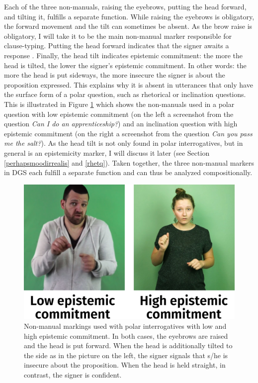 Each of the three non-manuals, raising the eyebrows, putting the head forward, and tilting it, fulfills a separate function. While raising the eyebrows is obligatory, the forward movement and the tilt can sometimes be absent. As the brow raise is obligatory, I will take it to be the main non-manual marker responsible for clause-typing. Putting the head forward indicates that the signer awaits a response \citep[171--172]{papaspyrou2008grammatik}. Finally, the head tilt indicates epistemic commitment: the more the head is tilted, the lower the signer's epistemic commitment. In other words: the more the head is put sideways, the more insecure the signer is about the proposition expressed. This explains why it is absent in utterances that only have the surface form of a polar question, such as rhetorical or inclination questions. This is illustrated in Figure \ref{fig:epistemiccommitment} which shows the non-manuals used in a polar question with low epistemic commitment (on the left a screenshot from the question \textit{Can I do an apprenticeship?}) and an inclination question with high epistemic commitment (on the right a screenshot from the question \textit{Can you pass me the salt?}). As the head tilt is not only found in polar interrogatives, but in general is an epistemicity marker, I will discuss it later (see Section \ref{perhapsmoodirrealis} and \ref{rhetq}). Taken together, the three non-manual markers in DGS each fulfill a separate function and can thus be analyzed compositionally.

\begin{figure}[bt]
\centering
	\includegraphics[width=1.0\textwidth]{epistemiccommitment.jpg}
	\caption{Non-manual markings used with polar interrogatives with low and high epistemic commitment. In both cases, the eyebrows are raised and the head is put forward. When the head is additionally tilted to the side as in the picture on the left, the signer signals that s/he is insecure about the proposition. When the head is held straight, in contrast, the signer is confident.}
		\label{fig:epistemiccommitment}
\end{figure}	

